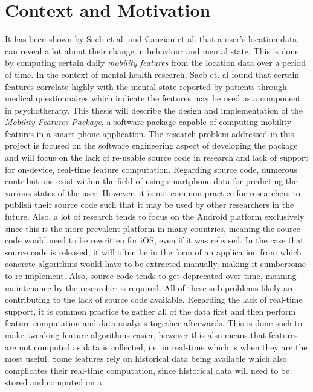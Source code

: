 \section{Context and Motivation}



It has been shown by Saeb et al. and Canzian et al. \cite{Saeb2015, Canzian2015} that a user's location data can reveal a lot about their change in behaviour and mental state. This is done by computing certain daily \textit{mobility features} from the location data over a period of time. In the context of mental health research, Saeb et. al \cite{Saeb2015} found that certain features correlate highly with the mental state reported by patients through medical questionnaires which indicate the features may be used as a component in psychotherapy. This thesis will describe the design and implementation of the \textit{Mobility Features Package}, a software package capable of computing mobility features in a smart-phone application. The research problem addressed in this project is focused on the software engineering aspect of developing the package and will focus on the lack of re-usable source code in research and lack of support for on-device, real-time feature computation. Regarding source code, numerous contributions exist within the field of using smartphone data for predicting the various states of the user. However, it is not common practice for researchers to publish their source code such that it may be used by other researchers in the future. Also, a lot of research tends to focus on the Android platform exclusively since this is the more prevalent platform in many countries, meaning the source code would need to be rewritten for iOS, even if it was released. In the case that source code is released, it will often be in the form of an application from which concrete algorithms would have to be extracted manually, making it cumbersome to re-implement. Also, source code tends to get deprecated over time, meaning maintenance by the researcher is required. All of these sub-problems likely are contributing to the lack of source code available. Regarding the lack of real-time support, it is common practice to gather all of the data first and then perform feature computation and data analysis together afterwards. This is done such to make tweaking feature algorithms easier, however this also means that features are not computed as data is collected, i.e. in real-time which is when they are the most useful. Some features rely on historical data being available which also complicates their real-time computation, since historical data will need to be stored and computed on a 